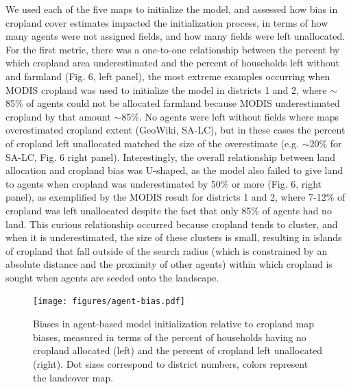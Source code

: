 \documentclass{pnastwo}
\begin{document}
\begin{article}
We used each of the five maps to initialize the model, and assessed how bias in cropland cover estimates impacted the initialization process, in terms of how many agents were not assigned fields, and how many fields were left unallocated. For the first metric, there was a one-to-one relationship between the percent by which cropland area underestimated and the percent of households left without and farmland (Fig. 6, left panel), the most extreme examples occurring when MODIS cropland was used to initialize the model in districts 1 and 2, where $\sim$85\% of agents could not be allocated farmland because MODIS underestimated cropland by that amount $\sim$85\%. No agents were left without fields where maps overestimated cropland extent (GeoWiki, SA-LC), but in these cases the percent of cropland left unallocated matched the size of the overestimate (e.g. $\sim$20\% for SA-LC, Fig. 6 right panel). Interestingly, the overall relationship between land allocation and cropland bias was U-shaped, as the model also failed to give land to agents when cropland was underestimated by 50\% or more (Fig. 6, right panel), as exemplified by the MODIS result for districts 1 and 2, where 7-12\% of cropland was left unallocated despite the fact that only 85\% of agents had no land.  This curious relationship occurred because cropland tends to cluster, and when it is underestimated, the size of these clusters is small, resulting in islands of cropland that fall outside of the search radius (which is constrained by an absolute distance and the proximity of other agents) within which cropland is sought when agents are seeded onto the landscape. 


\begin{figure}[ht]
\centerline{\texttt{[image: figures/agent-bias.pdf]}}
\caption{Biases in agent-based model initialization relative to cropland map biases, measured in terms of the percent of households having no cropland allocated (left) and the percent of cropland left unallocated (right). Dot sizes correspond to district numbers, colors represent the landcover map.}
\label{afoto}
\end{figure}


\end{article}
\end{document}
